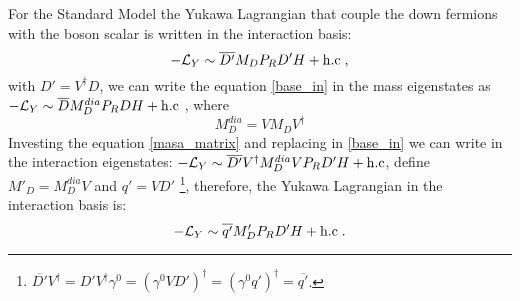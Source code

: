 \begin{frame}{}
For the Standard Model the Yukawa Lagrangian that couple the down fermions with the boson scalar is written in the interaction basis:
\begin{equation}\label{base_in}
  \mathcal{-L}_Y\sim\overline{D'}M_D P_R D'H + {\rm h.c}\; ,
\end{equation}
with $D'=V^{\dagger}D$, we can write the equation \ref{base_in} in the mass eigenstates 
as $\mathcal{-L}_Y\sim\overline{D}M_D^{dia}P_RDH + {\rm h.c}$ , where
\begin{equation}\label{masa_matrix}
  M_D^{dia}=VM_DV^{\dagger}
\end{equation}
 Investing the equation \ref{masa_matrix} and replacing in \ref{base_in} we can write in the interaction eigenstates:
$\mathcal{-L}_Y\sim \overline{D'}V^{\dagger}M_D^{dia}VP_R D'H + {\rm h.c}$, define $M'_D=M_D^{dia}V$ and $q'=VD'$ 
\footnote{$\overline{D'}V^{\dagger}=D'V^{\dagger}\gamma^0=(\gamma^0VD')^{\dagger}=(\gamma^0q')^{\dagger}=\overline{q'}$.}, therefore, the 
Yukawa Lagrangian in the interaction basis is:
\begin{equation}
  \mathcal{-L}_Y\sim\overline{q'}M_D' P_R D'H + {\rm h.c}\; .
\end{equation}




\end{frame}


